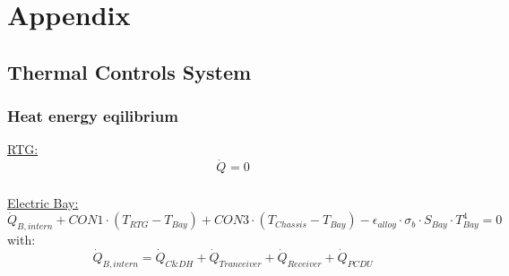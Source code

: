 %
%




\renewcommand\thesection{\Alph{section}}
\renewcommand\thefigure{\thesection\arabic{figure}}
\renewcommand{\thetable}{\thesection\arabic{table}}
\setcounter{figure}{0}
\setcounter{table}{0}
\setcounter{section}{0}

\chapter*{Appendix}

\label{chap:Appendix}

\section{Thermal Controls System} \label{sec:AppendixThermal}
\subsection{Heat energy eqilibrium}

\underline{RTG:}
\[ \dot{Q}_{} = 0  \]\\[2em]

\underline{Electric Bay:}
\[ \dot{Q}_{B,intern}+ CON1 \cdot (T_{RTG}-T_{Bay})+ CON3 \cdot (T_{Chassis}-T_{Bay})  -\epsilon_{alloy}\cdot \sigma_b \cdot S_{Bay}\cdot T_{Bay}^4=0 \]
with: 
\[\dot{Q}_{B,intern} = \dot{Q}_{C\&DH} + \dot{Q}_{Tranceiver} +\dot{Q}_{Receiver} +\dot{Q}_{PCDU} \] \\[2em]

